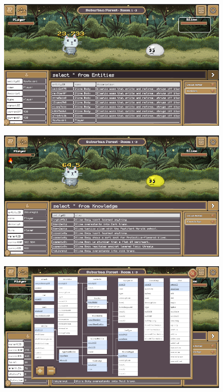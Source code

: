 \begin{figure}[H]
	\centering
	\includegraphics[width=13cm]{Images/gameplay3.png}
	\vspace{0.5cm}
	\caption{}
\end{figure}

\begin{figure}[H]
	\centering
	\includegraphics[width=13cm]{Images/gameplay4.png}
	\vspace{0.5cm}
	\caption{}
\end{figure}

\begin{figure}[H]
	\centering
	\includegraphics[width=13cm]{Images/gameplay5.png}
	\vspace{0.5cm}
	\caption{}
\end{figure}


